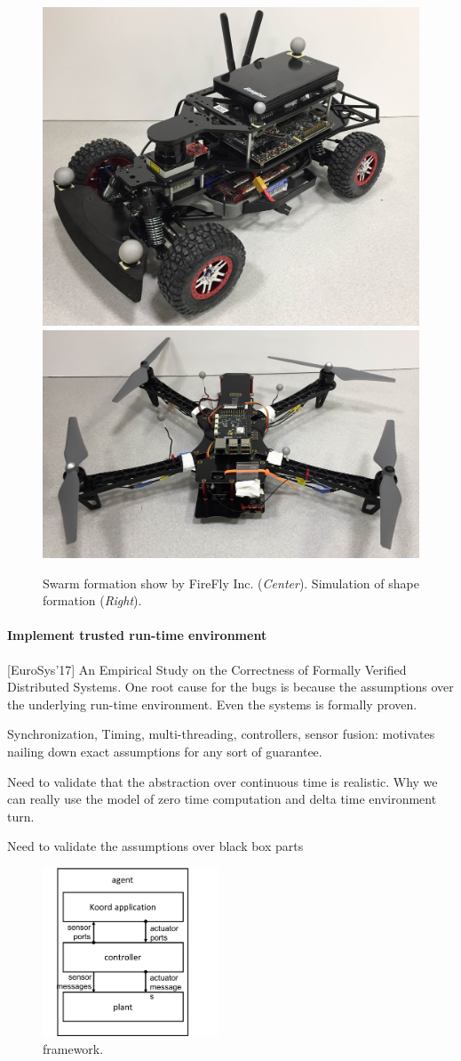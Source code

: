 \begin{figure}[h!]
\begin{minipage}{0.5\columnwidth}
	\includegraphics[width=0.4\linewidth]{figs/car.jpg}
	\includegraphics[width=0.55\linewidth]{figs/quad.jpg}
\end{minipage}%
	\caption{Swarm formation show by FireFly Inc. (\emph{Center}). Simulation of shape formation (\emph{Right}).}
    \label{fig:firefly}
\end{figure}

\paragraph{Implement trusted run-time environment}


[EuroSys'17] An Empirical Study on the Correctness of Formally Verified Distributed Systems.
One root cause for the bugs is because the assumptions over the underlying run-time environment. Even the systems is formally proven.

Synchronization, Timing, multi-threading, controllers, sensor fusion:
motivates nailing down exact assumptions for any sort of guarantee.

Need to validate that the abstraction over continuous time is realistic.
Why we can really use the model of zero time computation and delta time environment turn.

Need to validate the assumptions over black box parts


\begin{figure}[h!]
\centering
\includegraphics[height=5cm]{figs/arch.png}
\caption{\toolname framework.}
\label{fig:arch}
\end{figure}

